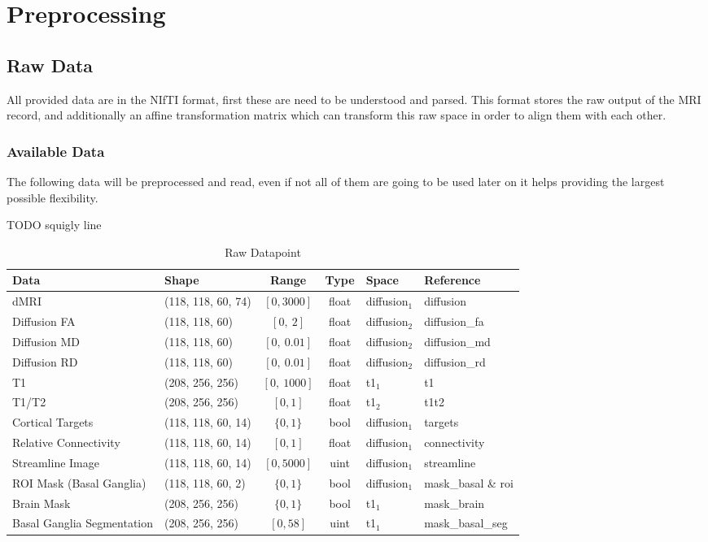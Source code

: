 \section{Preprocessing}

\subsection{Raw Data}
All provided data are in the \ac{NIfTI} format, first these are need to be understood and parsed. This format stores the raw output of the \ac{MRI} record, and additionally an affine transformation matrix which can transform this raw space in order to align them with each other.

\subsubsection{Available Data}
The following data will be preprocessed and read, even if not all of them are going to be used later on it helps providing the largest possible flexibility.

TODO squigly line

\begin{table}[H]
\centering
\begin{tabular}{|l|l|c|c|l|l|}
\hline
\textbf{Data} & \textbf{Shape} & \textbf{Range} & \textbf{Type} & \textbf{Space} & \textbf{Reference} \\ \hline
\ac{dMRI} & (118, 118, 60, 74) & $[0,3000]$ & float & diffusion$_1$ & diffusion \\ \hline
Diffusion \ac{FA} & (118, 118, 60) & $[0,~2]$ & float & diffusion$_2$ & diffusion\_fa \\ \hline
Diffusion \ac{MD} & (118, 118, 60) & $[0,~0.01]$ & float & diffusion$_2$ & diffusion\_md \\ \hline
Diffusion \ac{RD} & (118, 118, 60) & $[0,~0.01]$ & float & diffusion$_2$ & diffusion\_rd \\ \hline
T1 & (208, 256, 256) & $[0,~1000]$ & float & t1$_1$ & t1 \\ \hline
T1/T2 & (208, 256, 256) & $[0,1]$ & float & t1$_2$ & t1t2 \\ \hline
Cortical Targets & (118, 118, 60, 14) & $\{0,1\}$ & bool & diffusion$_1$ & targets \\ \hline
Relative Connectivity & (118, 118, 60, 14) & $[0,1]$ & float & diffusion$_1$ & connectivity \\ \hline
Streamline Image & (118, 118, 60, 14) & $[0,5000]$ & uint & diffusion$_1$ & streamline \\ \hline
\ac{ROI} Mask (Basal Ganglia) & (118, 118, 60, 2) & $\{0,1\}$ & bool & diffusion$_1$ & mask\_basal \& roi \\ \hline
Brain Mask & (208, 256, 256) & $\{0,1\}$ & bool & t1$_1$ & mask\_brain \\ \hline
Basal Ganglia Segmentation & (208, 256, 256) & $[0, 58]$ & uint & t1$_1$ & mask\_basal\_seg \\ \hline
\end{tabular}
\caption{Raw Datapoint}
\label{tab:datas1}
\end{table}

